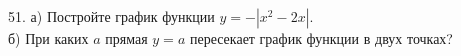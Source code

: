 51. а) Постройте график функции $y=-|x^2-2x|.$\\
б) При каких $a$ прямая $y=a$ пересекает график функции в двух точках?\\
